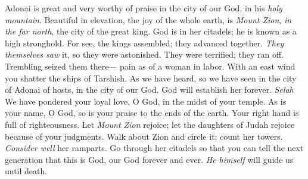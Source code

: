 \begin{biblechapter} %
 Adonai is great and very worthy of praise 
in the city of our God, in his \textit{holy mountain}.
\verse Beautiful in elevation, the joy of the whole earth, 
is \textit{Mount Zion}, \textit{in the far north}, 
the city of the great king.
\verse God is in her citadels; 
he is known as a high stronghold.
\verse For see, the kings assembled; 
they advanced together.
\verse \textit{They themselves saw} it, so they were astonished. 
They were terrified; they ran off.
\verse Trembling seized them there— 
pain as of a woman in labor.
\verse With an east wind 
you shatter the ships of Tarshish.
\verse As we have heard, so we have seen 
in the city of Adonai of hosts, in the city of our God. 
God will establish her forever. \textit{Selah}
\verse We have pondered your loyal love, O God, 
in the midst of your temple.
\verse As is your name, O God, so is your praise 
to the ends of the earth. 
Your right hand is full of righteousness.
\verse Let \textit{Mount Zion} rejoice; 
let the daughters of Judah rejoice 
because of your judgments.
\verse Walk about Zion and circle it; 
count her towers.
\verse \textit{Consider well} her ramparts. 
Go through her citadels 
so that you can tell the next generation
\verse that this is God, our God forever and ever. 
\textit{He himself} will guide us until death.
\end{biblechapter}


